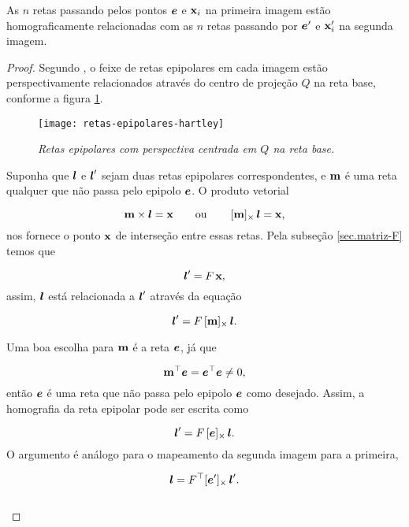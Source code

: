 \begin{teorema}
As $n$ retas passando pelos pontos $\boldsymbol{e}$ e $\mathbf{x}_i$ na primeira imagem estão homograficamente relacionadas com as $n$ retas passando por $\boldsymbol{e}'$ e $\mathbf{x}'_i$ na segunda imagem.
\end{teorema}

\begin{proof}
Segundo \cite{Hartley2004}, o feixe de retas epipolares em cada imagem estão perspectivamente relacionados através do centro de projeção $Q$ na reta base, conforme a figura \ref{fig.retas-epi-hartley}.

\begin{figure}[!htb]
\centering
\texttt{[image: retas-epipolares-hartley]}
\caption{\textit{Retas epipolares com perspectiva centrada em $Q$ na reta base.}}
\label{fig.retas-epi-hartley}
\end{figure}


Suponha que $\boldsymbol{l}$ e $\boldsymbol{l}'$ sejam duas retas epipolares correspondentes, e ${\bf m}$ é uma reta qualquer que não passa pelo epipolo $\boldsymbol{e}$. O produto vetorial 

\begin{equation}
{\bf m}\times\boldsymbol{l}=\mathbf{x}\qquad\text{ou}\qquad\,[{\bf m}]_\times\,\boldsymbol{l}=\mathbf{x},
\end{equation}
nos fornece o ponto $\mathbf{x}$ de interseção entre essas retas. Pela subseção \ref{sec.matriz-F} temos que

\begin{equation*}
\boldsymbol{l}'=F\,\mathbf{x},
\end{equation*} 
assim, $\boldsymbol{l}$ está relacionada a $\boldsymbol{l}'$ através da equação 

\begin{equation*}
\boldsymbol{l}'=F\,[{\bf m}]_\times\,\boldsymbol{l}.
\end{equation*}


Uma boa escolha para ${\bf m}$ é a reta $\boldsymbol{e}$, já que

\begin{equation*}
{\bf m}^\top\boldsymbol{e}=\boldsymbol{e}^\top\boldsymbol{e}\neq0,
\end{equation*}
então $\boldsymbol{e}$ é uma reta que não passa pelo epipolo $\boldsymbol{e}$ como desejado. Assim, a homografia da reta epipolar pode ser escrita como 

\begin{equation*}
\boldsymbol{l}'=F\,[\boldsymbol{e}]_\times\,\boldsymbol{l}.
\end{equation*}
O argumento é análogo para o mapeamento da segunda imagem para a primeira,

\begin{equation*}
\boldsymbol{l}=F^\top [\boldsymbol{e}']_\times\,\boldsymbol{l}'.
\end{equation*}\\


\end{proof}


